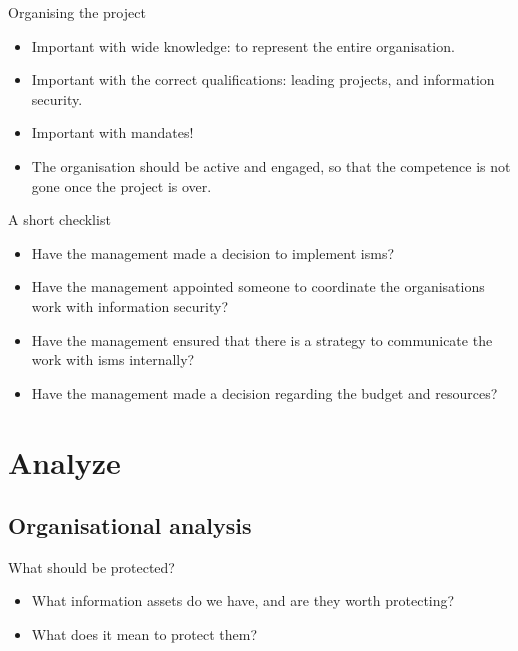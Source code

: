 \documentclass{beamer}
\begin{document}
\begin{frame}{Organising the project}
  \begin{itemize}
    \item Important with wide knowledge: to represent the entire organisation.
    \item Important with the correct qualifications: leading projects, and
      information security.
    \item Important with mandates!
    \item The organisation should be active and engaged, so that the competence
      is not gone once the project is over.
  \end{itemize}
\end{frame}

\begin{frame}{A short checklist}
  \begin{itemize}
    \item Have the management made a decision to implement \ac{isms}?
    \item Have the management appointed someone to coordinate the organisations
      work with information security?
    \item Have the management ensured that there is a strategy to communicate
      the work with \ac{isms} internally?
    \item Have the management made a decision regarding the budget and
      resources?
  \end{itemize}
\end{frame}

\section{Analyze}

\subsection{Organisational analysis}

\begin{frame}{What should be protected?}
  \begin{itemize}
    \item What information assets do we have, and are they worth protecting?
    \item What does it mean to protect them?
  \end{itemize}
\end{frame}
\end{document}
